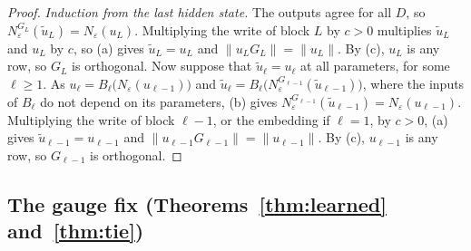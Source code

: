 \documentclass[10pt]{article}
\theoremstyle{definition}
\theoremstyle{remark}
\newcommand{\norm}[1]{\lVert #1\rVert}
\begin{document}
\begin{proof}
\emph{Induction from the last hidden state.} The outputs agree for all $D$, so $N_\varepsilon^{G_L}(\tilde u_L) = N_\varepsilon(u_L)$. Multiplying the write of block $L$ by $c > 0$ multiplies $\tilde u_L$ and $u_L$ by $c$, so (a) gives $\tilde u_L = u_L$ and $\norm{u_LG_L} = \norm{u_L}$. By (c), $u_L$ is any row, so $G_L$ is orthogonal. Now suppose that $\tilde u_\ell = u_\ell$ at all parameters, for some $\ell \ge 1$. As $u_\ell = B_\ell\big(N_\varepsilon(u_{\ell-1})\big)$ and $\tilde u_\ell = B_\ell\big(N_\varepsilon^{G_{\ell-1}}(\tilde u_{\ell-1})\big)$, where the inputs of $B_\ell$ do not depend on its parameters, (b) gives $N_\varepsilon^{G_{\ell-1}}(\tilde u_{\ell-1}) = N_\varepsilon(u_{\ell-1})$. Multiplying the write of block $\ell - 1$, or the embedding if $\ell = 1$, by $c > 0$, (a) gives $\tilde u_{\ell-1} = u_{\ell-1}$ and $\norm{u_{\ell-1}G_{\ell-1}} = \norm{u_{\ell-1}}$. By (c), $u_{\ell-1}$ is any row, so $G_{\ell-1}$ is orthogonal.
\end{proof}


\subsection{The gauge fix\texorpdfstring{ (Theorems~\ref*{thm:learned} and~\ref*{thm:tie})}{}}\label{app:prf-gauge}
\end{document}
